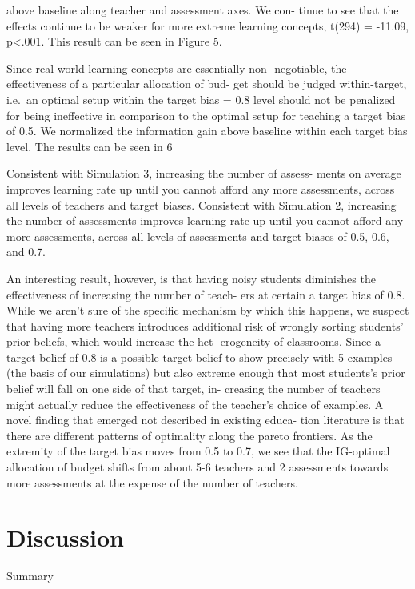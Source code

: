 \documentclass[10pt, letterpaper]{article}
\begin{document}
above baseline along teacher and assessment axes. We con- tinue to see
that the effects continue to be weaker for more extreme learning
concepts, t(294) = -11.09, p\textless{}.001. This result can be seen in
Figure 5.

Since real-world learning concepts are essentially non- negotiable, the
effectiveness of a particular allocation of bud- get should be judged
within-target, i.e.~an optimal setup within the target bias = 0.8 level
should not be penalized for being ineffective in comparison to the
optimal setup for teaching a target bias of 0.5. We normalized the
information gain above baseline within each target bias level. The
results can be seen in 6

Consistent with Simulation 3, increasing the number of assess- ments on
average improves learning rate up until you cannot afford any more
assessments, across all levels of teachers and target biases. Consistent
with Simulation 2, increasing the number of assessments improves
learning rate up until you cannot afford any more assessments, across
all levels of assessments and target biases of 0.5, 0.6, and 0.7.

An interesting result, however, is that having noisy students diminishes
the effectiveness of increasing the number of teach- ers at certain a
target bias of 0.8. While we aren't sure of the specific mechanism by
which this happens, we suspect that having more teachers introduces
additional risk of wrongly sorting students' prior beliefs, which would
increase the het- erogeneity of classrooms. Since a target belief of 0.8
is a possible target belief to show precisely with 5 examples (the basis
of our simulations) but also extreme enough that most students's prior
belief will fall on one side of that target, in- creasing the number of
teachers might actually reduce the effectiveness of the teacher's choice
of examples. A novel finding that emerged not described in existing
educa- tion literature is that there are different patterns of
optimality along the pareto frontiers. As the extremity of the target
bias moves from 0.5 to 0.7, we see that the IG-optimal allocation of
budget shifts from about 5-6 teachers and 2 assessments towards more
assessments at the expense of the number of teachers.

\section{Discussion}\label{discussion}

Summary
\end{document}
